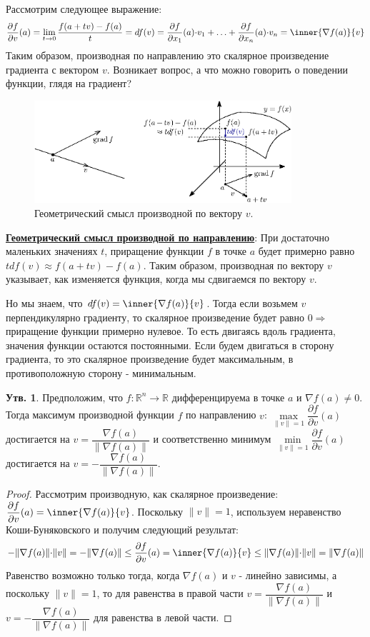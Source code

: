 \documentclass[12pt]{article}
\newcommand{\MR}{\mathbb{R}}
\theoremstyle{definition}
\newtheorem{prop}{Утв.}
\begin{document}
Рассмотрим следующее выражение:
$$
	\dfrac{\partial f}{\partial v}(a) = \lim\limits_{t \to 0}\dfrac{f(a+tv) - f(a)}{t} = df(v) = \dfrac{\partial f}{\partial x_1}(a){\cdot}v_1 + \dotsc + \dfrac{\partial f}{\partial x_n}(a){\cdot} v_n = \inner{\nabla f(a)}{v}
$$
Таким образом, производная по направлению это скалярное произведение градиента с вектором $v$. Возникает вопрос, а что можно говорить о поведении функции, глядя на градиент?
\begin{figure}[H]
	\centering
	\includegraphics[width=0.85\textwidth]{12_1.eps}
	\caption{Геометрический смысл производной по вектору $v$.}
	\label{12_1}
\end{figure}
\uline{\textbf{Геометрический смысл производной по направлению}}: При достаточно маленьких значениях $t$, приращение функции $f$ в точке $a$ будет примерно равно $tdf(v) \approx f(a + tv) - f(a)$. Таким образом, производная по вектору $v$ указывает, как изменяется функция, когда мы сдвигаемся по вектору $v$. 

Но мы знаем, что $df(v) = \inner{\nabla f(a)}{v}$. Тогда если возьмем $v$ перпендикулярно градиенту, то скалярное произведение будет равно $0 \Rightarrow$ приращение функции примерно нулевое. То есть двигаясь вдоль градиента, значения функции остаются постоянными. Если будем двигаться в сторону градиента, то это скалярное произведение будет максимальным, в противоположную сторону - минимальным.

\begin{prop}
	Предположим, что $f \colon \MR^n \to \MR$ дифференцируема в точке $a$ и $\nabla f(a) \neq 0$. Тогда максимум производной функции $f$ по направлению $v$: $\max\limits_{\|v\| = 1}\dfrac{\partial f}{\partial v}(a)$ достигается на $v = \dfrac{\nabla f(a)}{\|\nabla f(a) \|}$ и соответственно минимум $\min\limits_{\|v\| = 1}\dfrac{\partial f}{\partial v}(a)$ достигается на $v = - \dfrac{\nabla f(a)}{\|\nabla f(a) \|}$.
\end{prop}
\begin{proof}
	Рассмотрим производную, как скалярное произведение: $ \dfrac{\partial f}{\partial v}(a) = \inner{\nabla f(a)}{v}$. Поскольку $\|v\| = 1$, используем неравенство Коши-Буняковского и получим следующий результат:
	$$
		- \|\nabla f(a)\|{\cdot}\|v\| = - \|\nabla f(a)\| \leq \dfrac{\partial f}{\partial v}(a) = \inner{\nabla f(a)}{v} \leq  \|\nabla f(a)\|{\cdot}\|v\| =  \|\nabla f(a)\| 
	$$
	Равенство возможно только тогда, когда $\nabla f(a)$ и $v$ - линейно зависимы, а поскольку $\|v\| = 1$, то для равенства в правой части $v = \dfrac{\nabla f(a)}{\|\nabla f(a) \|}$  и $v = -\dfrac{\nabla f(a)}{\|\nabla f(a) \|}$ для равенства в левой части.
\end{proof}
\end{document}
